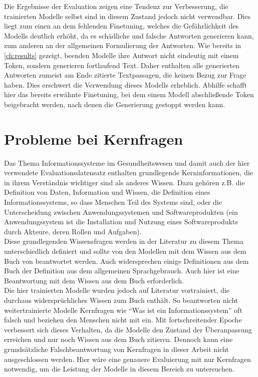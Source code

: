 Die Ergebnisse der Evaluation zeigen eine Tendenz zur Verbesserung, die trainierten Modelle selbst sind in diesem Zustand jedoch nicht verwendbar.
Dies liegt zum einen an dem fehlenden Finetuning, welches die Gefährlichkeit des Modells deutlich erhöht, da es schädliche und falsche Antworten generieren kann, zum anderen an der allgemeinen Formulierung der Antworten.
Wie bereits in \cref{ch:results} gezeigt, beenden Modelle ihre Antwort nicht eindeutig mit einem Token, sondern generieren fortlaufend Text.
Daher enthalten alle generierten Antworten zumeist am Ende zitierte Textpassagen, die keinen Bezug zur Frage haben.
Dies erschwert die Verwendung dieses Modells erheblich.
Abhilfe schafft hier das bereits erwähnte Finetuning, bei dem einem Modell abschließende Token beigebracht werden, nach denen die Generierung gestoppt werden kann.

\section{Probleme bei Kernfragen}
Das Thema Informationssysteme im Gesundheitswesen und damit auch der hier verwendete Evaluationsdatensatz enthalten grundlegende Kerninformationen,
die in ihrem Verständnis wichtiger sind als anderes Wissen. Dazu gehören z.B. die Definition von Daten, Information und Wissen, die Definition eines Informationssystems, so dass Menschen Teil des Systems sind, oder die Unterscheidung zwischen Anwendungssystemen und Softwareprodukten (ein Anwendungssystem ist die Installation und Nutzung eines Softwareprodukts durch Akteure, deren Rollen und Aufgaben).\\

Diese grundlegenden Wissensfragen werden in der Literatur zu diesem Thema unterschiedlich definiert und sollte von den Modellen mit dem Wissen aus dem Buch von \citet{bb} beantwortet werden.
Auch widersprechen einige Definitionen aus dem Buch der Definition aus dem allgemeinen Sprachgebrauch. Auch hier ist eine Beantwortung mit dem Wissen aus dem Buch erforderlich.\\

Die hier trainierten Modelle wurden jedoch auf Literatur vortrainiert, die durchaus widersprüchliches Wissen zum Buch enthält.
So beantworten nicht weitertrainierte Modelle Kernfragen wie \enquote{Was ist ein Informationssystem} oft falsch und beziehen den Menschen nicht mit ein.
Mit fortschreitender Epoche verbessert sich dieses Verhalten, da die Modelle den Zustand der Überanpassung erreichen und nur noch Wissen aus dem Buch zitieren.
Dennoch kann eine grundsätzliche Falschbeantwortung von Kernfragen in dieser Arbeit nicht ausgeschlossen werden.
Hier wäre eine genauere Evaluierung mit nur Kernfragen notwendig, um die Leistung der Modelle in diesem Bereich zu untersuchen.\\

